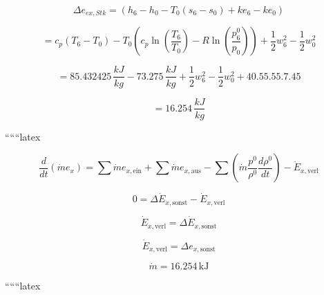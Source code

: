 \[
\Delta e_{ex,Stk} = (h_6 - h_0 - T_0 (s_6 - s_0) + ke_6 - ke_0)
\]

\[
= c_p (T_6 - T_0) - T_0 \left( c_p \ln \left( \frac{T_6}{T_0} \right) - R \ln \left( \frac{p_6^0}{p_0} \right) \right) + \frac{1}{2} w_6^2 - \frac{1}{2} w_0^2
\]

\[
= 85.432425 \, \frac{kJ}{kg} - 73.275 \, \frac{kJ}{kg} + \frac{1}{2} w_6^2 - \frac{1}{2} w_0^2 + 40.55.55.7.45
\]

\[
= 16.254 \, \frac{kJ}{kg}
\]

``````latex

\[
\frac{d}{d t} \left( \dot{m} e_x \right) = \sum \dot{m} e_{x, \text{ein}} + \sum \dot{m} e_{x, \text{aus}} - \sum \left( \dot{m} \frac{p^0}{\rho^0} \frac{d \rho^0}{d t} \right) - \dot{E}_{x, \text{verl}}
\]

\[
0 = \Delta \dot{E}_{x, \text{sonst}} - \dot{E}_{x, \text{verl}}
\]

\[
\dot{E}_{x, \text{verl}} = \Delta \dot{E}_{x, \text{sonst}}
\]

\[
\dot{E}_{x, \text{verl}} = \Delta e_{x, \text{sonst}}
\]

\[
\dot{m} = 16.254 \, \text{kJ}
\]

``````latex


